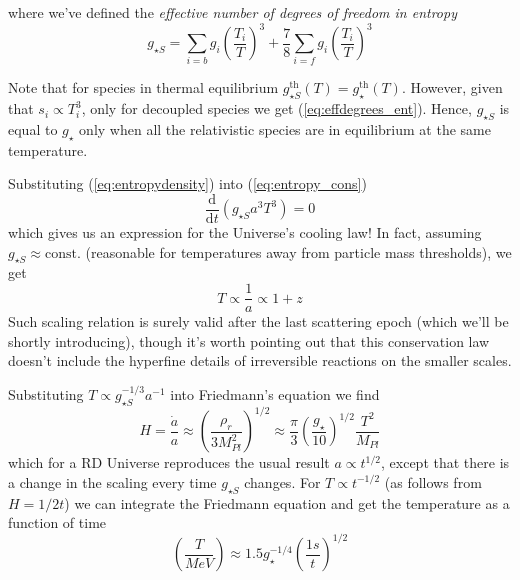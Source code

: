 where we've defined the \emph{effective number of degrees of freedom in entropy}
\begin{equation}
    g_{\star S} = \sum_{i=b}g_{i}\left(\frac{T_{i}}{T}\right)^{3} + \frac{7}{8}\sum_{i=f}g_{i}\left(\frac{T_{i}}{T}\right)^{3}
    \label{eq:effdegrees_ent}
\end{equation}
\par Note that for species in thermal equilibrium $g_{\star S}^{\text{th}}(T) = g_{\star}^{\text{th}}(T)$. However, given that $s_{i} \propto T_{i}^{3}$, only for decoupled species we get (\ref{eq:effdegrees_ent}). Hence, $g_{\star S}$ is equal to $g_{\star}$ only when all the relativistic species are in equilibrium at the same temperature.
\par Substituting (\ref{eq:entropydensity}) into (\ref{eq:entropy_cons})
\begin{equation}
    \frac{\text{d}}{\text{d}t}(g_{\star S}a^{3}T^{3}) = 0
\end{equation}
which gives us an expression for the Universe's cooling law! In fact, assuming $g_{\star S} \approx \text{const.}$ (reasonable for temperatures away from particle mass thresholds), we get 
\begin{equation}
    \boxed{
    T \propto \frac{1}{a} \propto 1+z
    }
\end{equation}
Such scaling relation is surely valid after the last scattering epoch (which we'll be shortly introducing), though it's worth pointing out that this conservation law doesn't include the hyperfine details of irreversible reactions on the smaller scales.
\par Substituting $T \propto g_{\star S}^{-1/3}a^{-1}$ into Friedmann's equation we find 
\begin{equation}
    H = \frac{\dot{a}}{a} \approx \left(\frac{\rho_{r}}{3M_{Pl}^{2}}\right)^{1/2} \approx \frac{\pi}{3}\left(\frac{g_{\star}}{10}\right)^{1/2}\frac{T^{2}}{M_{Pl}}
\end{equation}
which for a RD Universe reproduces the usual result $a\propto t^{1/2}$, except that there is a change in the scaling every time $g_{\star S}$ changes. For $T \propto t^{-1/2}$ (as follows from $H = 1/2t$) we can integrate the Friedmann equation and get the temperature as a function of time
\begin{equation}
    \left(\frac{T}{\unit{MeV}}\right) \approx 1.5g_{\star}^{-1/4}\left(\frac{1\unit{s}}{t}\right)^{1/2}
\end{equation}

